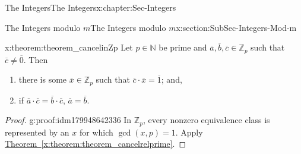 \documentclass[oneside,10pt,]{book}
\newcommand{\xreffont}{\relax}
\numberwithin{equation}{section}
\def\Z{{\mathbb Z}}
\def\N{{\mathbb N}}
\begin{document}
\begin{chapterptx}{The Integers}{}{The Integers}{}{}{x:chapter:Sec-Integers}
\begin{sectionptx}{The Integers modulo \(m\)}{}{The Integers modulo \(m\)}{}{}{x:section:SubSec-Integers-Mod-m}
\begin{theorem}{}{}{x:theorem:theorem_cancelinZp}%
Let \(p\in \N\) be prime and \(\overline{a},\overline{b},\overline{c}\in \Z_p\) such that \(\overline{c}\ne \overline{0}\). Then%
\begin{enumerate}
\item{}there is some \(\overline{x}\in \Z_p\) such that \(\overline{c}\cdot \overline{x} = \overline{1}\); and,%
\item{}if \(\overline{a} \cdot\overline{c} = \overline{b}\cdot\overline{c}\), \(\overline{a} = \overline{b}\).%
\end{enumerate}
%
\end{theorem}
\begin{proof}{}{g:proof:idm179948642336}
In \(\Z_p\), every nonzero equivalence class is represented by an \(x\) for which \(\gcd(x,p) = 1\). Apply \hyperref[x:theorem:theorem_cancelrelprime]{Theorem~{\xreffont\ref{x:theorem:theorem_cancelrelprime}}}.%
\end{proof}
\end{sectionptx}
\end{chapterptx}
%
%
\typeout{************************************************}
\typeout{************************************************}
%
\end{document}
